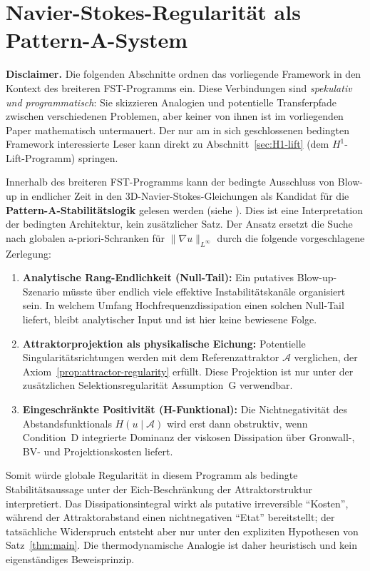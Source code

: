 \documentclass[12pt,a4paper]{article}
\theoremstyle{definition}
\theoremstyle{plain}
\theoremstyle{remark}
\begin{document}
\section[Navier-Stokes als Pattern-A-System]{Navier-Stokes-Regularität als Pattern-A-System}

\noindent\textbf{Disclaimer.}\;
Die folgenden Abschnitte ordnen das vorliegende Framework in den Kontext
des breiteren FST-Programms ein. Diese Verbindungen sind
\emph{spekulativ und programmatisch}: Sie skizzieren Analogien und
potentielle Transferpfade zwischen verschiedenen Problemen, aber keiner
von ihnen ist im vorliegenden Paper mathematisch untermauert.
Der nur am in sich geschlossenen bedingten Framework interessierte
Leser kann direkt zu Abschnitt~\ref{sec:H1-lift} (dem $H^1$-Lift-Programm)
springen.

\medskip
Innerhalb des breiteren FST-Programms kann der bedingte Ausschluss von Blow-up in endlicher Zeit in den 3D-Navier-Stokes-Gleichungen als Kandidat für die \textbf{Pattern-A-Stabilitätslogik} gelesen werden (siehe \cite{FST-Unified2026}). Dies ist eine Interpretation der bedingten Architektur, kein zusätzlicher Satz. Der Ansatz ersetzt die Suche nach globalen a-priori-Schranken für $\|\nabla u\|_{L^\infty}$ durch die folgende vorgeschlagene Zerlegung:

\begin{enumerate}[label=\alph*)]
    \item \textbf{Analytische Rang-Endlichkeit (Null-Tail):} Ein putatives Blow-up-Szenario müsste über endlich viele effektive Instabilitätskanäle organisiert sein. In welchem Umfang Hochfrequenzdissipation einen solchen Null-Tail liefert, bleibt analytischer Input und ist hier keine bewiesene Folge.
    \item \textbf{Attraktorprojektion als physikalische Eichung:} Potentielle Singularitätsrichtungen werden mit dem Referenzattraktor $\mathcal{A}$ verglichen, der Axiom~\ref{prop:attractor-regularity} erfüllt. Diese Projektion ist nur unter der zusätzlichen Selektionsregularität Assumption~G verwendbar.
    \item \textbf{Eingeschränkte Positivität (H-Funktional):} Die Nichtnegativität des Abstandsfunktionals $H(u \mid \mathcal{A})$ wird erst dann obstruktiv, wenn Condition~D integrierte Dominanz der viskosen Dissipation über Gronwall-, BV- und Projektionskosten liefert.
\end{enumerate}

Somit würde globale Regularität in diesem Programm als bedingte Stabilitätsaussage unter der Eich-Beschränkung der Attraktorstruktur interpretiert. Das Dissipationsintegral wirkt als putative irreversible ``Kosten'', während der Attraktorabstand einen nichtnegativen ``Etat'' bereitstellt; der tatsächliche Widerspruch entsteht aber nur unter den expliziten Hypothesen von Satz~\ref{thm:main}. Die thermodynamische Analogie ist daher heuristisch und kein eigenständiges Beweisprinzip.
\end{document}
